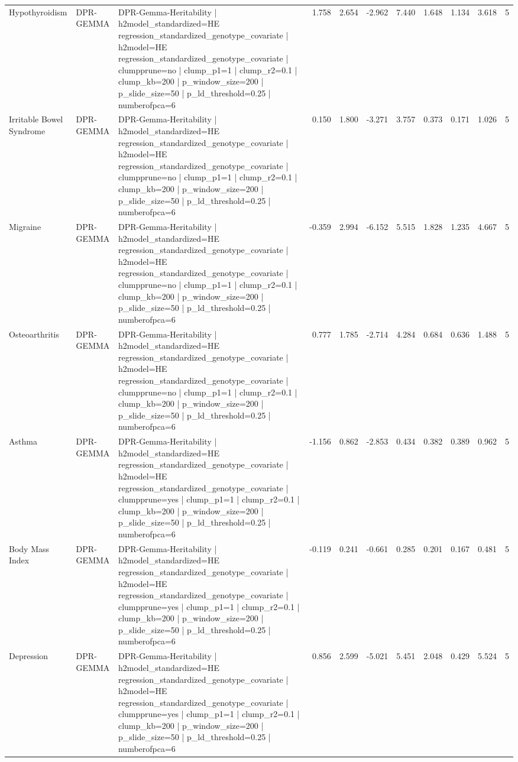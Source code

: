 \begin{landscape}
\begin{longtable}{p{2.4cm}p{1.8cm}p{6.0cm}rrrrrrrr}
Hypothyroidism & DPR-GEMMA & DPR-Gemma-Heritability | h2model\_standardized=HE regression\_standardized\_genotype\_covariate | h2model=HE regression\_standardized\_genotype\_covariate | clumpprune=no | clump\_p1=1 | clump\_r2=0.1 | clump\_kb=200 | p\_window\_size=200 | p\_slide\_size=50 | p\_ld\_threshold=0.25 | numberofpca=6 & 1.758 & 2.654 & -2.962 & 7.440 & 1.648 & 1.134 & 3.618 & 5 \\
Irritable Bowel Syndrome & DPR-GEMMA & DPR-Gemma-Heritability | h2model\_standardized=HE regression\_standardized\_genotype\_covariate | h2model=HE regression\_standardized\_genotype\_covariate | clumpprune=no | clump\_p1=1 | clump\_r2=0.1 | clump\_kb=200 | p\_window\_size=200 | p\_slide\_size=50 | p\_ld\_threshold=0.25 | numberofpca=6 & 0.150 & 1.800 & -3.271 & 3.757 & 0.373 & 0.171 & 1.026 & 5 \\
Migraine & DPR-GEMMA & DPR-Gemma-Heritability | h2model\_standardized=HE regression\_standardized\_genotype\_covariate | h2model=HE regression\_standardized\_genotype\_covariate | clumpprune=no | clump\_p1=1 | clump\_r2=0.1 | clump\_kb=200 | p\_window\_size=200 | p\_slide\_size=50 | p\_ld\_threshold=0.25 | numberofpca=6 & -0.359 & 2.994 & -6.152 & 5.515 & 1.828 & 1.235 & 4.667 & 5 \\
Osteoarthritis & DPR-GEMMA & DPR-Gemma-Heritability | h2model\_standardized=HE regression\_standardized\_genotype\_covariate | h2model=HE regression\_standardized\_genotype\_covariate | clumpprune=no | clump\_p1=1 | clump\_r2=0.1 | clump\_kb=200 | p\_window\_size=200 | p\_slide\_size=50 | p\_ld\_threshold=0.25 | numberofpca=6 & 0.777 & 1.785 & -2.714 & 4.284 & 0.684 & 0.636 & 1.488 & 5 \\
Asthma & DPR-GEMMA & DPR-Gemma-Heritability | h2model\_standardized=HE regression\_standardized\_genotype\_covariate | h2model=HE regression\_standardized\_genotype\_covariate | clumpprune=yes | clump\_p1=1 | clump\_r2=0.1 | clump\_kb=200 | p\_window\_size=200 | p\_slide\_size=50 | p\_ld\_threshold=0.25 | numberofpca=6 & -1.156 & 0.862 & -2.853 & 0.434 & 0.382 & 0.389 & 0.962 & 5 \\
Body Mass Index & DPR-GEMMA & DPR-Gemma-Heritability | h2model\_standardized=HE regression\_standardized\_genotype\_covariate | h2model=HE regression\_standardized\_genotype\_covariate | clumpprune=yes | clump\_p1=1 | clump\_r2=0.1 | clump\_kb=200 | p\_window\_size=200 | p\_slide\_size=50 | p\_ld\_threshold=0.25 | numberofpca=6 & -0.119 & 0.241 & -0.661 & 0.285 & 0.201 & 0.167 & 0.481 & 5 \\
Depression & DPR-GEMMA & DPR-Gemma-Heritability | h2model\_standardized=HE regression\_standardized\_genotype\_covariate | h2model=HE regression\_standardized\_genotype\_covariate | clumpprune=yes | clump\_p1=1 | clump\_r2=0.1 | clump\_kb=200 | p\_window\_size=200 | p\_slide\_size=50 | p\_ld\_threshold=0.25 | numberofpca=6 & 0.856 & 2.599 & -5.021 & 5.451 & 2.048 & 0.429 & 5.524 & 5 \\

\end{longtable}
\end{landscape}

